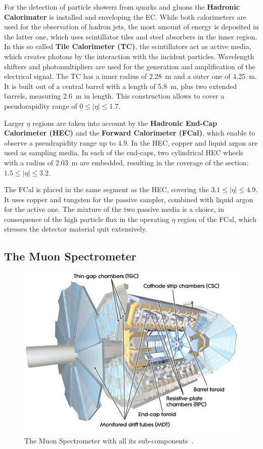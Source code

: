 For the detection of particle showers from quarks and gluons the \textbf{Hadronic Calorimater} is installed and enveloping the EC. While both calorimeters are used for the observation of hadron jets, the most amount of energy is deposited in the latter one, which uses scintillator tiles and steel absorbers in the inner region. In this so called \textbf{Tile Calorimeter (TC)}, the scintillators act as active media, which creates photons by the interaction with the incident particles. Wavelength shifters and photomultipliers are  used for the generation and amplification of the electrical signal. The TC has a inner radius of 2.28~m and a outer one of 4.25~m. It is built out of a central barrel with a length of 5.8~m, plus two extended barrels, measuring 2.6~m in length. This construction  allows to cover a pseudorapidity range of $0 \leq \mid\eta\mid \leq1.7$.

 Larger $\eta$ regions are taken into account by the \textbf{Hadronic End-Cap Calorimeter (HEC)} and the \textbf{Forward Calorimeter (FCal)}, which enable to observe a pseudrapidity range up to 4.9.  In the HEC, copper and liquid argon are used as sampling media. In each of the end-caps, two cylindrical HEC wheels with a radius of 2.03~m are embedded, resulting in the coverage of the section: $1.5 \leq \mid\eta\mid \leq3.2$.

 The FCal is placed in the same segment as the HEC, covering the $3.1 \leq \mid\eta\mid \leq 4.9$. It uses copper and tungsten for the passive sampler, combined with liquid argon for the active one. The mixture of the two passive media is a choice, in consequence of the high particle flux in the operating $\eta$ region of the FCal, which stresses the detector material quit extensively.




\subsection{The Muon Spectrometer}\label{MD}

\begin{figure}[h]
	\centering
	\includegraphics[width=0.65\linewidth]{Pics/cp3/36}
	\caption{The Muon Spectrometer with all its sub-components~\cite{Aad:2008zzm}.} 
	\label{fig:36}
\end{figure}

